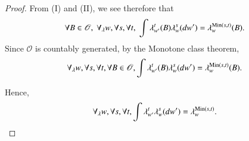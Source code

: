 \begin{proof}
From (I) and (II), we see therefore that 
$$
\forall B \in \mathscr{O}, \; \forall_\lambda w, \forall s, \forall t,
\; \int \lambda^t_{w'} (B) \lambda^s_w(dw') =
\lambda^{\operatorname{Min}(s,t)}_w(B). 
$$
Since $\mathscr{O}$ is countably generated, by the Monotone class
theorem, 
$$
\forall_\lambda w, \forall s, \forall t, \forall B \in \mathscr{O},
\int \lambda^t_{w'} (B) \lambda^s_w(dw') = \lambda^{\operatorname{Min}(s,t)}_w(B).
$$

Hence,
$$
\forall_\lambda w, \forall s, \forall t, \int \lambda^t_{w'}
\lambda^s_w(dw') = \lambda^{\operatorname{Min}(s,t)}_w.
$$
\end{proof}
